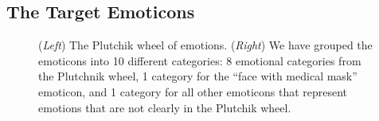 \documentclass[11pt]{article}
\newcommand{\fixme}[1]{}
\begin{document}
\subsection{The Target Emoticons}

\begin{figure}
    \centering
    \label{fig:plu_wheel}
    \caption{
        (\emph{Left}) 
        The Plutchik wheel of emotions.
        (\emph{Right}) 
        We have grouped the emoticons into 10 different categories:
        8 emotional categories from the Plutchnik wheel,
        1 category for the ``face with medical mask'' emoticon,
        and 1 category for all other emoticons that represent emotions that are not clearly in the Plutchik wheel.
    }
    \label{fig:Mapped_emojis}%
\end{figure}
\end{document}
